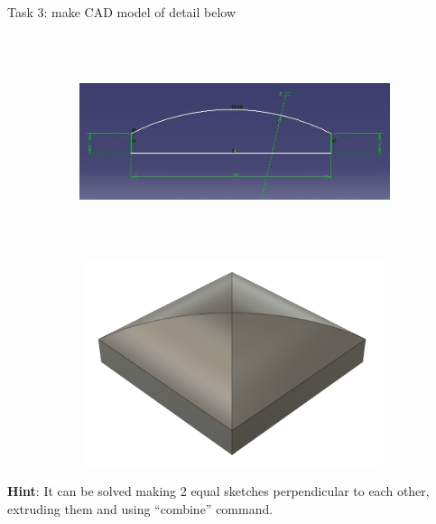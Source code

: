 \documentclass[aspectratio=169]{beamer}
\newcommand{\fbckg}[1]{\usebackgroundtemplate{\texttt{[image: \#1]}}}%
\begin{document}
    \begin{frame}[c]{Task 3: make CAD model of detail below}
        \framesubtitle{}
            \vspace{-0.6cm}
            \begin{figure}[H]
                \begin{subfigure}{0.65\textwidth}
                    \centering\includegraphics[height=6cm,width=1\textwidth,keepaspectratio]{resources/task_31.jpg}
                    \label{fig:resources/task_31.jpg}
                \end{subfigure}
                \begin{subfigure}{0.32\textwidth}
                    \centering\includegraphics[height=6cm,width=1\textwidth,keepaspectratio]{resources/task_32.png}
                    \label{fig:resources/task_32.png}
                \end{subfigure}
            \end{figure}
            \textbf{Hint}: It can be solved making 2 equal sketches perpendicular to each other, extruding them and using “combine” command. 

        \end{frame} 

\fbckg{fibeamer/figs/last_page.png}
\frame[plain]{}
\end{document}
